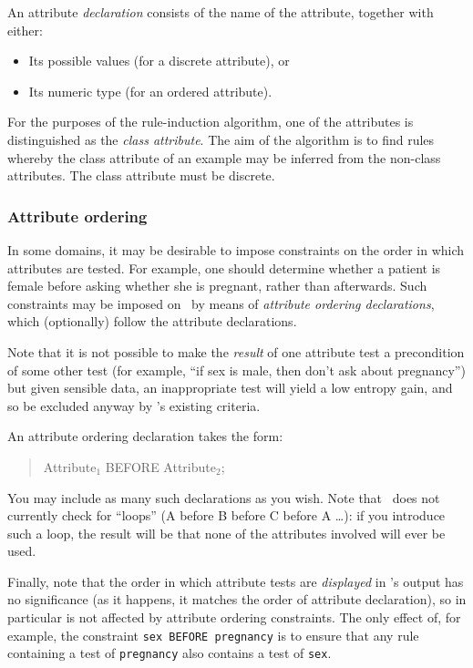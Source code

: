 An attribute {\it declaration} consists of the name of the attribute,
together with either:
\begin{itemize}
 \item Its possible values (for a discrete attribute), or
 \item Its numeric type (for an ordered attribute).
\end{itemize}

For the purposes of the rule-induction algorithm, one of the
attributes is distinguished as the {\it class attribute}.
The aim of the algorithm is to find rules whereby the class
attribute of an example may be inferred from the non-class 
attributes. The class attribute must be discrete.


\subsubsection{Attribute ordering}
In some domains, it may be desirable to impose constraints
on the order in which attributes are tested.  For example,
one should determine whether a patient is female before asking
whether she is pregnant, rather than afterwards.  Such
constraints may be imposed on \CN\ by means of 
{\it attribute ordering declarations}, which (optionally) follow
the attribute declarations. 

Note that it is not possible
to make the {\it result} of one attribute test a precondition 
of some other test (for example, ``if sex is male, then don't
ask about pregnancy'') but given sensible data, an inappropriate
test will yield a low entropy gain, and so be excluded anyway
by \CN's existing criteria.

An attribute ordering declaration takes the form:
\begin{quotation}
Attribute$_1$ BEFORE Attribute$_2$;
\end{quotation}

You may include as many such declarations as you wish.  Note
that \CN\ does not currently check for ``loops'' (A before B
before C before A \ldots): if you introduce such a loop, the
result will be that none of the attributes involved will ever
be used.

Finally, note that the order in which attribute tests are {\it displayed}
in \CN's output has no significance (as it happens, it matches the
order of attribute declaration), so in particular is not affected by
attribute ordering constraints.  The only effect of, for example, the constraint 
{\tt sex BEFORE pregnancy} is to ensure that any
rule containing a test of {\tt pregnancy} also contains a test of 
{\tt sex}.

